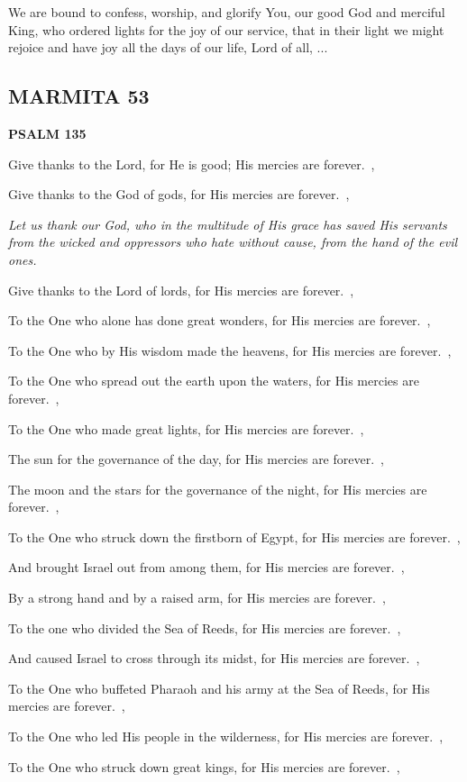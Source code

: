 \documentclass[12pt,twoside,a5paper]{article}
\newcommand{\marmita}[1]{\subsection*{MARMITA {#1}}}
\newcommand{\psalm}[1]{\textbf{PSALM {#1}}\nopagebreak}
\newcommand{\qanona}[1]{{\liturgicalhint{Qanona.} \emph{#1}}}
\newcommand{\slota}[1]{\liturgicalhint{Slota.} #1}
\begin{document}
\slota{We are bound to confess, worship, and glorify You, our good God and merciful King, who ordered lights for the joy of our service, that in their light we might rejoice and have joy all the days of our life, Lord of all, ...}

\marmita{53}

\psalm{135}

\begin{normalparskip}
  Give thanks to the Lord, for He is good; His mercies are forever.~\sep

  Give thanks to the God of gods, for His mercies are forever.~\sep

  \qanona{Let us thank our God, who in the multitude of His grace has saved His servants from the wicked and oppressors who hate without cause, from the hand of the evil ones.}

  Give thanks to the Lord of lords, for His mercies are forever.~\sep

  To the One who alone has done great wonders, for His mercies are forever.~\sep

  To the One who by His wisdom made the heavens, for His mercies are forever.~\sep

  To the One who spread out the earth upon the waters, for His mercies are forever.~\sep

  To the One who made great lights, for His mercies are forever.~\sep

  The sun for the governance of the day, for His mercies are forever.~\sep

  The moon and the stars for the governance of the night, for His mercies are forever.~\sep

  To the One who struck down the firstborn of Egypt, for His mercies are forever.~\sep

  And brought Israel out from among them, for His mercies are forever.~\sep

  By a strong hand and by a raised arm, for His mercies are forever.~\sep

  To the one who divided the Sea of Reeds, for His mercies are forever.~\sep

  And caused Israel to cross through its midst, for His mercies are forever.~\sep

  To the One who buffeted Pharaoh and his army at the Sea of Reeds, for His mercies are forever.~\sep

  To the One who led His people in the wilderness, for His mercies are forever.~\sep

  To the One who struck down great kings, for His mercies are forever.~\sep


\end{normalparskip}
\end{document}
